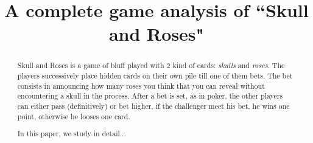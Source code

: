 \documentclass[conference]{IEEEtran}
\begin{document}
%
\title{A complete game analysis of ``Skull and Roses"}


\author{
\and
{}
\and
{}
}



\maketitle


\begin{abstract}
Skull and Roses is a game of bluff played with 2 kind of cards: \emph{skulls} and \emph{roses}. The players successively place hidden cards on their own pile till one of them bets.
The bet consists in announcing how many roses you think that you can reveal without encountering a skull in the process. After a bet is set, as in poker,
the other players can either pass (definitively) or bet higher, if the challenger meet his bet, he wins one point, otherwise he looses one card.\newline

In this paper, we study in detail... %
\end{abstract}






%
\IEEEpeerreviewmaketitle
\end{document}

